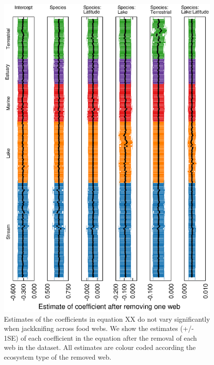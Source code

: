 \documentclass[12pt]{article}
\begin{document}
    \begin{figure}[h]
    \centerline{\includegraphics*[width=.8\textwidth]{Figures/Jackknife/LS_web.eps}}
    \caption{Estimates of the coefficients in equation XX do not vary significantly
    when jackknifing across food webs. We show the estimates (+/- 1SE) of each coefficient
    in the equation after the removal of each web in the dataset. All estimates are colour
    coded according the ecosystem type of the removed web.}
    \label{LS_web}
    \end{figure}
\end{document}
